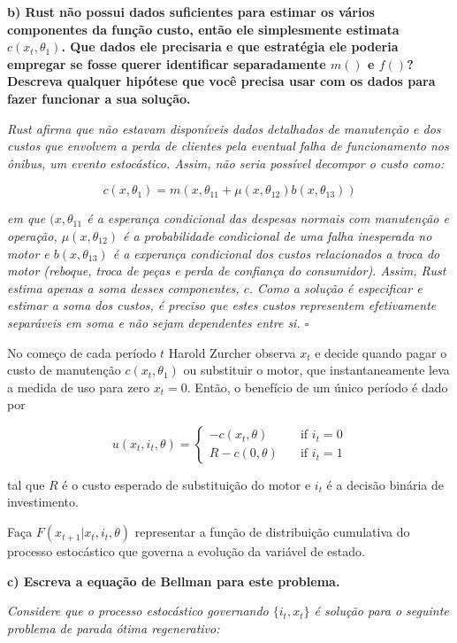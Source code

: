 \documentclass[12pt,a4paper]{article}
\begin{document}
\textbf{b) Rust não possui dados suficientes para estimar os vários
componentes da função custo, então ele simplesmente estimata
\(c(x_t, \theta_1)\). Que dados ele precisaria e que estratégia ele
poderia empregar se fosse querer identificar separadamente \(m()\) e
\(f()\)? Descreva qualquer hipótese que você precisa usar com os dados
para fazer funcionar a sua solução.}

\emph{Rust afirma que não estavam disponíveis dados detalhados de
manutenção e dos custos que envolvem a perda de clientes pela eventual
falha de funcionamento nos ônibus, um evento estocástico. Assim, não
seria possível decompor o custo como:}

\[
c(x,\theta_1) = m(x,\theta_{11}+\mu(x,\theta_{12})b(x,\theta_{13}))
\]

\emph{em que \((x,\theta_{11}\) é a esperança condicional das despesas
normais com manutenção e operação, \(\mu(x,\theta_{12})\) é a
probabilidade condicional de uma falha inesperada no motor e
\(b(x,\theta_{13})\) é a experança condicional dos custos relacionados a
troca do motor (reboque, troca de peças e perda de confiança do
consumidor). Assim, Rust estima apenas a soma desses componentes, \(c\).
Como a solução é especificar e estimar a soma dos custos, é preciso que
estes custos representem efetivamente separáveis em soma e não sejam
dependentes entre si. \(\square\)}

No começo de cada período \(t\) Harold Zurcher observa \(x_t\) e decide
quando pagar o custo de manutenção \(c(x_t, \theta_1)\) ou substituir o
motor, que instantaneamente leva a medida de uso para zero \(x_t = 0\).
Então, o benefício de um único período é dado por

\[ u(x_t,i_t,\theta) = 
  \begin{cases}
    -c(x_t,\theta)    & \quad \text{if } i_t=0\\
    R - c(0,\theta)  & \quad \text{if } i_t=1
  \end{cases}
\]

tal que \(R\) é o custo esperado de substituição do motor e \(i_t\) é a
decisão binária de investimento.

Faça \(F(x_{t+1}| x_t, i_t, \theta)\) representar a função de
distribuição cumulativa do processo estocástico que governa a evolução
da variável de estado.

\textbf{c) Escreva a equação de Bellman para este problema.}

\emph{Considere que o processo estocástico governando \(\{i_t,x_t\}\) é
solução para o seguinte problema de parada ótima regenerativo:}
\end{document}
